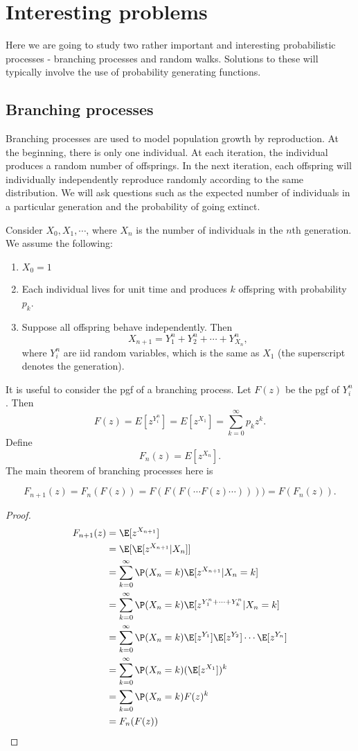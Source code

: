\documentclass[a4paper]{article}
\begin{document}
\section{Interesting problems}
Here we are going to study two rather important and interesting probabilistic processes - branching processes and random walks. Solutions to these will typically involve the use of probability generating functions.

\subsection{Branching processes}
Branching processes are used to model population growth by reproduction. At the beginning, there is only one individual. At each iteration, the individual produces a random number of offsprings. In the next iteration, each offspring will individually independently reproduce randomly according to the same distribution. We will ask questions such as the expected number of individuals in a particular generation and the probability of going extinct.

Consider $X_0, X_1, \cdots$, where $X_n$ is the number of individuals in the $n$th generation. We assume the following:
\begin{enumerate}
  \item $X_0 = 1$
  \item Each individual lives for unit time and produces $k$ offspring with probability $p_k$.
  \item Suppose all offspring behave independently. Then
    \[
      X_{n + 1} = Y_1^n + Y_2^n + \cdots + Y_{X_n}^n,
    \]
    where $Y_i^n$ are iid random variables, which is the same as $X_1$ (the superscript denotes the generation).
\end{enumerate}
It is useful to consider the pgf of a branching process. Let $F(z)$ be the pgf of $Y_i^n$. Then
\[
  F(z) = E[z^{Y_i^n}] = E[z^{X_1}] = \sum_{k = 0}^\infty p_k z^k.
\]
Define
\[
  F_n(z) = E[z^{X_n}].
\]
The main theorem of branching processes here is
\begin{thm}
  \[
    F_{n + 1}(z) = F_n(F(z)) = F(F(F(\cdots F(z) \cdots )))) = F(F_n(z)).
  \]
\end{thm}

\begin{proof}
  \begin{align*}
    F_{n + 1}(z) &= \E[z^{X_{n + 1}}]\\
    &= \E[\E[z^{X_{n + 1}}|X_n]]\\
    &= \sum_{k = 0}^\infty \P(X_n = k)\E[z^{X_{n + 1}}|X_n = k]\\
    &= \sum_{k = 0}^\infty \P(X_n = k)\E[z^{Y_1^n + \cdots + Y_k^n}|X_n = k]\\
    &= \sum_{k = 0}^\infty \P(X_n = k)\E[z^{Y_1}]\E[z^{Y_2}]\cdots\E[z^{Y_n}]\\
    &= \sum_{k = 0}^\infty \P(X_n = k)(\E[z^{X_1}])^k\\
    &= \sum_{k = 0}\P(X_n = k)F(z)^k\\
    &= F_n(F(z))
  \end{align*}
\end{proof}
\end{document}
